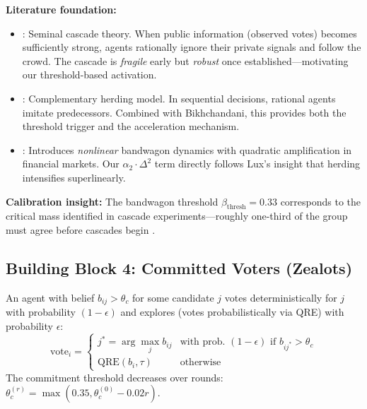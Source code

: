 \textbf{Literature foundation:}
\begin{itemize}[nosep]
\item \citet{bikhchandani1992theory}: Seminal cascade theory. When public information
      (observed votes) becomes sufficiently strong, agents rationally ignore their
      private signals and follow the crowd. The cascade is \emph{fragile} early but
      \emph{robust} once established---motivating our threshold-based activation.
\item \citet{banerjee1992simple}: Complementary herding model. In sequential decisions,
      rational agents imitate predecessors. Combined with Bikhchandani, this provides
      both the threshold trigger and the acceleration mechanism.
\item \citet{lux1995herd}: Introduces \emph{nonlinear} bandwagon dynamics with
      quadratic amplification in financial markets. Our $\alpha_2 \cdot \Delta^2$
      term directly follows Lux's insight that herding intensifies superlinearly.
\end{itemize}

\textbf{Calibration insight:} The bandwagon threshold $\beta_{\text{thresh}} = 0.33$
corresponds to the critical mass identified in cascade experiments---roughly one-third
of the group must agree before cascades begin \citep{bikhchandani1992theory}.


\subsection{Building Block 4: Committed Voters (Zealots)}
\label{sec:bp-zealot}

\begin{tcolorbox}[colback=blue!3!white, colframe=blue!60!black, title=Axiom VTM-4: Committed Voting]
An agent with belief $b_{ij} > \theta_c$ for some candidate $j$ votes
deterministically for $j$ with probability $(1 - \epsilon)$ and explores
(votes probabilistically via QRE) with probability $\epsilon$:
\begin{equation}
\text{vote}_i = \begin{cases}
j^* = \arg\max_j b_{ij} & \text{with prob. } (1 - \epsilon) \text{ if } b_{ij^*} > \theta_c \\
\text{QRE}(b_i, \tau) & \text{otherwise}
\end{cases}
\label{eq:committed}
\end{equation}
The commitment threshold decreases over rounds: $\theta_c^{(r)} = \max(0.35, \theta_c^{(0)} - 0.02r)$.
\end{tcolorbox}

